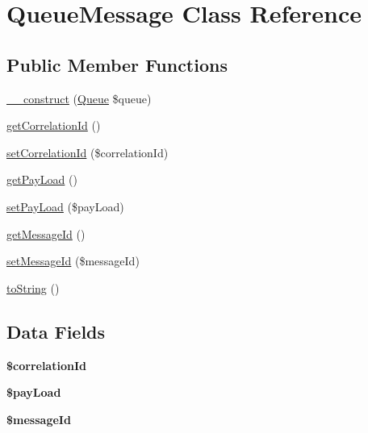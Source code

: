 \hypertarget{class_queue_message}{\section{Queue\+Message Class Reference}
\label{class_queue_message}
}
\subsection*{Public Member Functions}
\begin{DoxyCompactItemize}
\item 
\hyperlink{class_queue_message_a638917e21ed8dba0215842d8406069a2}{\+\_\+\+\_\+construct} (\hyperlink{class_queue}{Queue} \$queue)
\item 
\hyperlink{class_queue_message_ab1279e776b9fa05f90c29652d63688d1}{get\+Correlation\+Id} ()
\item 
\hyperlink{class_queue_message_ad4e800d324b4e8ee4c06de6e74c182e9}{set\+Correlation\+Id} (\$correlation\+Id)
\item 
\hyperlink{class_queue_message_a6f2f98529411adf607679e8b70a6f2ac}{get\+Pay\+Load} ()
\item 
\hyperlink{class_queue_message_a2fe551080199cf8b2fc18b83b1bae40a}{set\+Pay\+Load} (\$pay\+Load)
\item 
\hyperlink{class_queue_message_a5687f36f39c8921fc7ae867f446ac5b3}{get\+Message\+Id} ()
\item 
\hyperlink{class_queue_message_afb35a18d0d73349c5a477f734f1a36aa}{set\+Message\+Id} (\$message\+Id)
\item 
\hyperlink{class_queue_message_a5558c5d549f41597377fa1ea8a1cefa3}{to\+String} ()
\end{DoxyCompactItemize}
\subsection*{Data Fields}
\begin{DoxyCompactItemize}
\item 
\hypertarget{class_queue_message_ae2b5592dd6c4d62b432f96e5bfdd907e}{{\bfseries \$correlation\+Id}}\label{class_queue_message_ae2b5592dd6c4d62b432f96e5bfdd907e}

\item 
\hypertarget{class_queue_message_afc9496e79d005f29c075b14983ff1b1c}{{\bfseries \$pay\+Load}}\label{class_queue_message_afc9496e79d005f29c075b14983ff1b1c}

\item 
\hypertarget{class_queue_message_ace4880fd0df34ae1190f153baa43cbc4}{{\bfseries \$message\+Id}}\label{class_queue_message_ace4880fd0df34ae1190f153baa43cbc4}

\end{DoxyCompactItemize}


